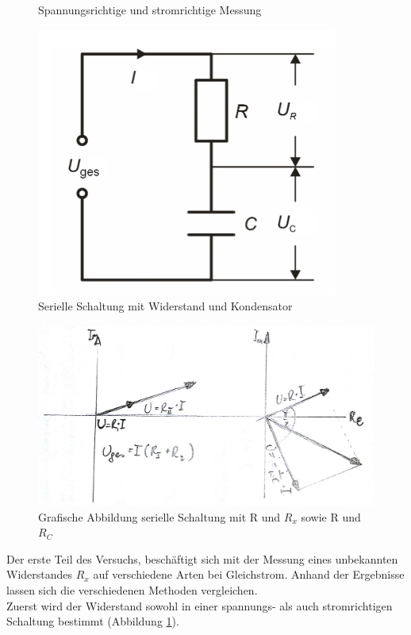 \documentclass[12pt,a4paper]{article}
\begin{document}
\begin{multicols}{2}
\begin{figure}[H]
	\caption{Spannungsrichtige und stromrichtige Messung }
	\label{fig:403}
\end{figure}
\begin{figure}[H]
	\centering
  	\includegraphics[scale=1]{./figure/seriell_mit_c.png}
	\caption{Serielle Schaltung mit Widerstand und Kondensator}
	\label{fig:404}
\end{figure}
\begin{figure}[H]
	\centering
  	\includegraphics[scale=0.25]{./figure/komplex.png}
	\caption{Grafische Abbildung serielle Schaltung mit R und $R_x$ sowie R und $R_C$}
	\label{fig:405}
\end{figure}
Der erste Teil des Versuchs, beschäftigt sich mit der Messung eines unbekannten Widerstandes $R_{x}$ auf verschiedene Arten bei Gleichstrom. Anhand der Ergebnisse lassen sich die verschiedenen Methoden vergleichen.\\
Zuerst wird der Widerstand sowohl in einer spannungs- als auch stromrichtigen Schaltung bestimmt (Abbildung \ref{fig:403}).\\

\end{multicols}
\end{document}
